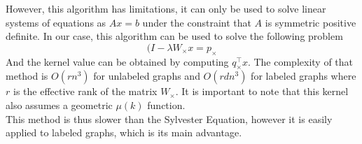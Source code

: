 \documentclass{article}
\theoremstyle{definition}
\begin{document}
However, this algorithm has limitations, it can only be used to solve linear systems of equations as $Ax=b$ under the constraint that $A$ is symmetric positive definite.
In our case, this algorithm can be used to solve the following problem 
\begin{equation}
	(I-\lambda W_{\times}x=p_{\times}
\end{equation}
And the kernel value can be obtained by computing $q_{\times}^{\top}x$. The complexity of that method is $O(rn^3)$ for unlabeled graphs and $O(rdn^3)$ for labeled graphs where $r$ is the effective rank of the matrix $W_{\times}$. It is important to note that this kernel also assumes a geometric $\mu(k)$ function. \\
This method is thus slower than the Sylvester Equation, however it is easily applied to labeled graphs, which is its main advantage.
\end{document}
